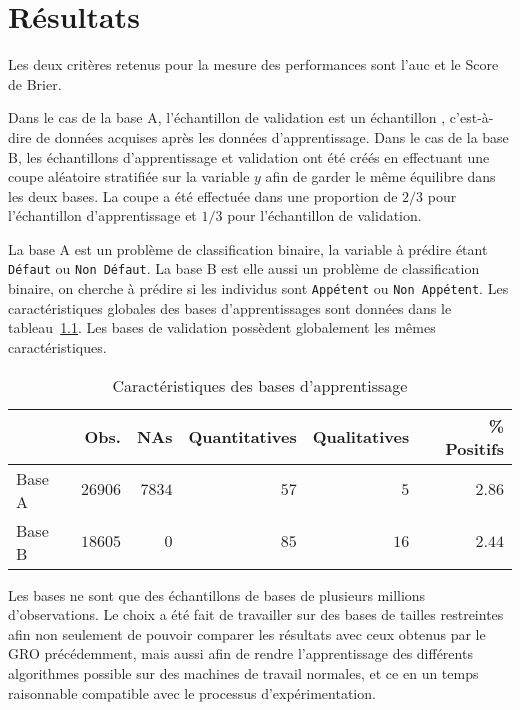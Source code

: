 
\cleardoublepage
{}
\chapter{Résultats}

Les deux critères retenus pour la mesure des performances sont l'\ac{auc} et le Score de Brier.

Dans le cas de la base A, l'échantillon de validation est un échantillon , c'est-à-dire de données acquises après les données d'apprentissage. Dans le cas de la base B, les échantillons d'apprentissage et validation ont été créés en effectuant une coupe aléatoire stratifiée sur la variable $y$ afin de garder le même équilibre dans les deux bases. La coupe a été effectuée dans une proportion de $2/3$ pour l'échantillon d'apprentissage et $1/3$ pour l'échantillon de validation.

La base A est un problème de classification binaire, la variable à prédire étant \texttt{Défaut} ou \texttt{Non Défaut}. La base B est elle aussi un problème de classification binaire, on cherche à prédire si les individus sont \texttt{Appétent} ou \texttt{Non Appétent}. Les caractéristiques globales des bases d'apprentissages sont données dans le tableau~\ref{table:bases}. Les bases de validation possèdent globalement les mêmes caractéristiques.

\begin{table}[h]
    \centering
    \begin{tabular}{lrrrrr}
    \toprule
    & Obs. & NAs & Quantitatives & Qualitatives & \% Positifs \\
    \midrule
    Base A & $26906$ & $7834$ & $57$ & $5$ & $2.86$ \\
    Base B & $18605$ & $0$ & $85$ & $16$ & $2.44$ \\
    \bottomrule
    \end{tabular}
    \caption{Caractéristiques des bases d'apprentissage}\label{table:bases}
\end{table}

Les bases ne sont que des échantillons de bases de plusieurs millions d'observations. Le choix a été fait de travailler sur des bases de tailles restreintes afin non seulement de pouvoir comparer les résultats avec ceux obtenus par le GRO précédemment, mais aussi afin de rendre l'apprentissage des différents algorithmes possible sur des machines de travail normales, et ce en un temps raisonnable compatible avec le processus d'expérimentation.

